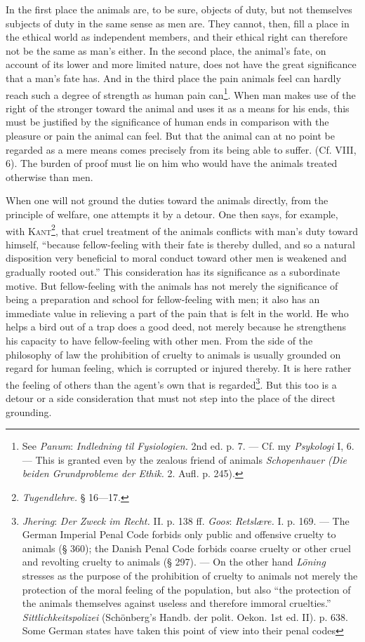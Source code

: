 \documentclass[12pt,a4paper,openany]{book}
\newcommand{\opage}[1]{\marginnote{\footnotesize\textit{[#1]}}}
\begin{document}
In the first place the animals are, to be sure, objects of duty, but not themselves subjects of duty in the same sense
as men are. They cannot, then, fill a place in the ethical world as independent members, and their ethical right can
therefore not be the same as man's either. In the second place, the animal's fate, on account of its lower and more
limited nature, does not have the great significance that a man's fate has. And in the third place the pain animals
feel can hardly reach such a degree of strength as human pain can\footnote[1]{See \emph{Panum}: \textit{Indledning til
Fysiologien.} 2nd ed. p. 7. --- Cf. my \textit{Psykologi} I, 6. --- This is granted even by the zealous friend of
animals \emph{Schopenhauer} \textit{(Die beiden Grundprobleme der Ethik.} 2. Aufl. p. 245).}. When man makes use of
the right of the stronger toward the animal and uses it as a means for his ends, this must be justified by the
significance of human ends in comparison with the pleasure or pain the animal can feel. But that the animal can at no
point be regarded as a mere means comes precisely from its being able to suffer. (Cf. VIII, 6). The burden of proof
must lie on him who would have the animals treated otherwise than men.

When one will not ground the duties toward the animals directly, from the principle of welfare, one attempts it by a
detour. One then says, for example, with \textsc{Kant}\footnote[2]{\textit{Tugendlehre.} § 16---17.}, that cruel treatment of the
animals conflicts with man's duty toward himself, ``because fellow-feeling with their fate is thereby dulled, and so a
natural disposition very beneficial to moral conduct toward other men is weakened and gradually rooted out.'' This
consideration has its significance as a subordinate motive. But fellow-feeling
\opage{249}with the animals has not merely the significance of being a preparation and school for fellow-feeling with
men; it also has an immediate value in relieving a part of the pain that is felt in the world. He who helps a bird out
of a trap does a good deed, not merely because he strengthens his capacity to have fellow-feeling with other men. From
the side of the philosophy of law the prohibition of cruelty to animals is usually grounded on regard for human feeling,
which is corrupted or injured thereby. It is here rather the feeling of others than the agent's own that is
regarded\footnote[1]{\emph{Jhering}: \textit{Der Zweck im Recht.} II. p. 138 ff. \emph{Goos}: \textit{Retslære.} I. p. 169.
--- The German Imperial Penal Code forbids only public and offensive cruelty to animals (§ 360); the Danish Penal Code
forbids coarse cruelty or other cruel and revolting cruelty to animals (§ 297). --- On the other hand \emph{Löning} stresses
as the purpose of the prohibition of cruelty to animals not merely the protection of the moral feeling of the
population, but also ``the protection of the animals themselves against useless and therefore immoral cruelties.''
\textit{Sittlichkeitspolizei} (Schönberg's Handb. der polit. Oekon. 1st ed. II). p. 638. Some German states have
taken this point of view into their penal codes}. But this too is a detour or a side consideration that must not step
into the place of the direct grounding.
\end{document}
